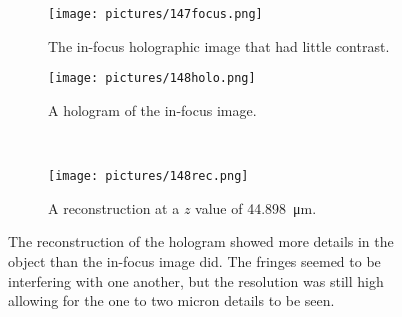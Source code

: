 
\begin{figure}[ht!]
    \begin{center}

        \begin{subfigure}[t]{0.4\textwidth}
            \label{fig:147focus}
            \texttt{[image: pictures/147focus.png]}
            \caption{The in-focus holographic image that had little contrast.}
        \end{subfigure}
        \hspace*{\fill}
        \begin{subfigure}[t]{0.4\textwidth}
            \label{fig:148holo}
            \texttt{[image: pictures/148holo.png]}
            \caption{A hologram of the in-focus image.}
        \end{subfigure}
        \\
        \begin{subfigure}[t]{\textwidth}
            \label{fig:148rec}
            \texttt{[image: pictures/148rec.png]}
            \caption{A reconstruction at a $z$ value of
                \SI{44.898}{\micro\meter}.}
        \end{subfigure}


    \end{center}
    \caption{%
        The reconstruction of the hologram showed more details in the object
        than the in-focus image did. The fringes seemed to be interfering with
        one another, but the resolution was still high allowing for the one to
        two micron details to be seen.
    }%
    \label{fig:148}
\end{figure}
\clearpage

